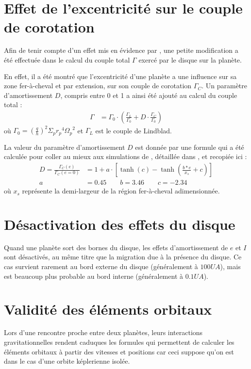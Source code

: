 \section{Effet de l'excentricité sur le couple de corotation}
Afin de tenir compte d'un effet mis en évidence par \cite{bitsch2010orbital}, une petite modification a été effectuée dans le calcul du couple total $\Gamma$ exercé par le disque sur la planète. 

En effet, il a été montré que l'excentricité d'une planète a une influence sur sa zone fer-à-cheval et par extension, sur son couple de corotation $\Gamma_C$. Un paramètre d'amortissement $D$, compris entre 0 et 1 a ainsi été ajouté au calcul du couple total \citep{hellary2012global} :
\begin{align}
\Gamma &= \Gamma_0 \cdot (\frac{\Gamma_L}{\Gamma_0} + D\cdot \frac{\Gamma_C}{\Gamma_0})
\end{align}
où $\Gamma_0 = \left(\frac{q}{h}\right)^2\Sigma_p {r_p}^4 {\Omega_p}^2$ et $\Gamma_L$ est le couple de Lindblad.

La valeur du paramètre d'amortissement $D$ est donnée par une formule qui a été calculée pour coller au mieux aux simulations de \cite{bitsch2010orbital}, détaillée dans \cite{cossou2013convergence}, et recopiée ici : 
\begin{subequations}
\begin{align}
D = \frac{\Gamma_C(e)}{\Gamma_C (e=0)} &= 1 + a \cdot \left[\tanh(c) - \tanh\left(\frac{b * e}{x_s}+c\right)\right]\label{eq:eccentricity-influence}\\
a &= 0.45 \qquad b=3.46 \qquad c= -2.34
\end{align}
\end{subequations}
où $x_s$ représente la demi-largeur de la région fer-à-cheval adimensionnée.

\section{Désactivation des effets du disque}
Quand une planète sort des bornes du disque, les effets d'amortissement de $e$ et $I$ sont désactivés, au même titre que la migration due à la présence du disque. Ce cas survient rarement au bord externe du disque (généralement à $100\unit{UA}$), mais est beaucoup plus probable au bord interne (généralement à $0.1\unit{UA}$).

\section{Validité des éléments orbitaux}
Lors d'une rencontre proche entre deux planètes, leurs interactions gravitationnelles rendent caduques les formules qui permettent de calculer les éléments orbitaux à partir des vitesses et positions car ceci suppose qu'on est dans le cas d'une orbite képlerienne isolée. 

